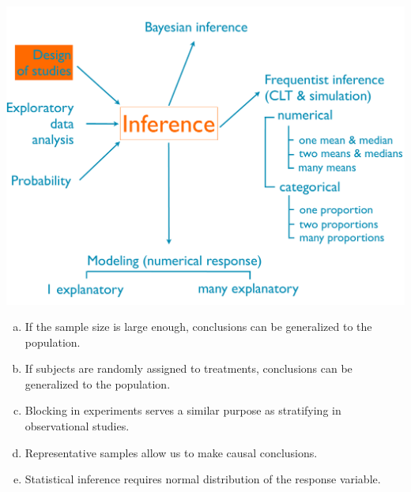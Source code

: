 \documentclass[11pt,containsverbatim,handout,xcolor=xelatex,dvipsnames,table]{beamer}
\newcommand{\solnMult}[1]{#1}
\begin{document}
\begin{frame}

{
{\scriptsize
{}}}
{
 \includegraphics[width=\textwidth]{figures/map/design}
}

\vfill

{\footnotesize
\begin{enumerate}[(a)]
\item If the sample size is large enough, conclusions can be generalized to the population.
\item If subjects are randomly assigned to treatments, conclusions can be generalized to the population.
\item \solnMult{Blocking in experiments serves a similar purpose as stratifying in observational studies.}
\item Representative samples allow us to make causal conclusions.
\item Statistical inference requires normal distribution of the response variable.
\end{enumerate}
}

\end{frame}

\end{document}
